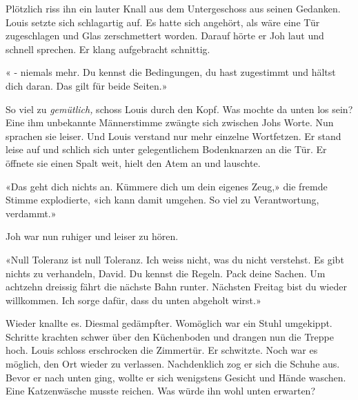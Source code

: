 Plötzlich riss ihn ein lauter Knall aus dem Untergeschoss aus seinen
Gedanken. Louis setzte sich schlagartig auf. Es hatte sich angehört, als
wäre eine Tür zugeschlagen und Glas zerschmettert worden. Darauf hörte
er Joh laut und schnell sprechen. Er klang aufgebracht schnittig.

« - niemals mehr. Du kennst die Bedingungen, du hast zugestimmt und
hältst dich daran. Das gilt für beide Seiten.»

So viel zu \emph{gemütlich,} schoss Louis durch den Kopf. Was mochte da
unten los sein?
Eine ihm unbekannte Männerstimme zwängte sich zwischen Johs Worte. Nun
sprachen sie leiser. Und Louis verstand nur mehr einzelne Wortfetzen. Er
stand leise auf und schlich sich unter gelegentlichem Bodenknarzen an
die Tür. Er öffnete sie einen Spalt weit, hielt den Atem an und
lauschte.

«Das geht dich nichts an. Kümmere dich um dein eigenes Zeug,» die fremde
Stimme explodierte, «ich kann damit umgehen. So viel zu Verantwortung,
verdammt.»

Joh war nun ruhiger und leiser zu hören.

«Null Toleranz ist null Toleranz. Ich weiss nicht, was du nicht 
verstehst. Es gibt nichts zu verhandeln, David. Du kennst die Regeln.
Pack deine Sachen. Um achtzehn dreissig fährt die nächste Bahn runter.
Nächsten Freitag bist du wieder willkommen. Ich sorge dafür, dass du
unten abgeholt wirst.»

Wieder knallte es. Diesmal gedämpfter. Womöglich war ein Stuhl
umgekippt. Schritte krachten schwer über den Küchenboden und drangen nun
die Treppe hoch. Louis schloss erschrocken die Zimmertür. Er schwitzte.
Noch war es möglich, den Ort wieder zu verlassen. Nachdenklich zog er sich die Schuhe aus.
Bevor er nach unten ging, wollte er sich wenigstens Gesicht und Hände waschen. Eine Katzenwäsche musste reichen. 
Was würde ihn wohl unten erwarten?

